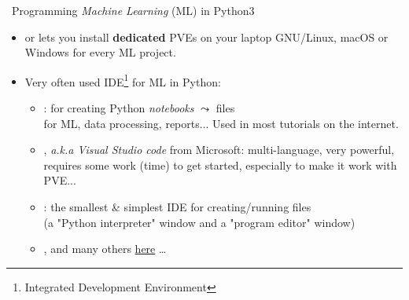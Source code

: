\documentclass[10pt,serif,mathserif,compress,hyperref={colorlinks}]{beamer}
\begin{document}
\begin{frame}
  
  \begin {bclogo}[noborder=true, couleur=gray!50, couleurBarre=Chocolate, logo=\bctrombone, marge=0, margeG=-0.5]
    {\ Programming {\em Machine Learning} (ML) in Python3}
    \medskip
    \begin{itemize}
    \item {} or  lets you install {\bf dedicated} PVEs on your laptop
      GNU/Linux, macOS or Windows for every ML project.\medskip
    \item Very often used IDE\footnote{Integrated Development Environment} for ML in Python:
      \begin{itemize}
      \item {}: for creating Python {\em notebooks} $\leadsto$ files \\ for ML, data processing, reports... 
        Used in most tutorials on the internet.\medskip
      \item {}, {\em a.k.a Visual Studio code} from Microsoft: multi-language, very powerful, requires some work (time) to get started,
        especially to make it work with PVE...\medskip
      \item {}: the smallest \& simplest IDE for creating/running  files\\
        (a "Python interpreter" window and a "program editor" window)\medskip
      \item {},  and many others \href{https://wiki.python.org/moin/IntegratedDevelopmentEnvironments}{here} \ldots
      \end{itemize}
    \end{itemize}
    \medskip
  \end{bclogo}
  
\end{frame}
\end{document}
